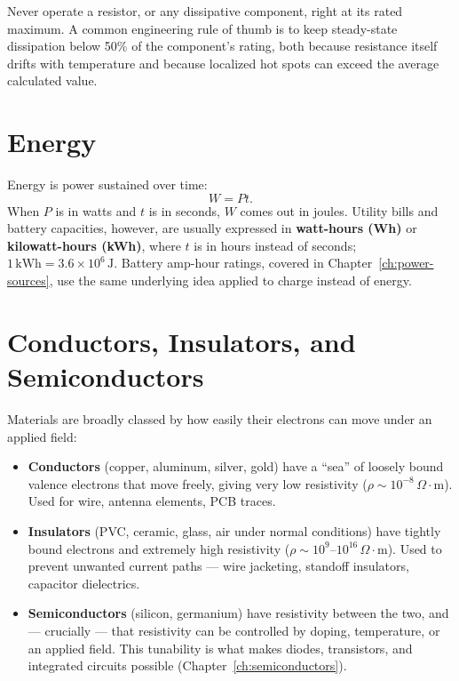 \begin{safetynote}
Never operate a resistor, or any dissipative component, right at its
rated maximum. A common engineering rule of thumb is to keep steady-state
dissipation below 50\% of the component's rating, both because
resistance itself drifts with temperature and because localized hot spots
can exceed the average calculated value.
\label{sec:power-derating}
\end{safetynote}

\section{Energy}

Energy is power sustained over time:
\[
W = Pt.
\]
When $P$ is in watts and $t$ is in seconds, $W$ comes out in joules.
Utility bills and battery capacities, however, are usually expressed in
\textbf{watt-hours (Wh)} or \textbf{kilowatt-hours (kWh)}, where $t$ is in
hours instead of seconds; $1\,\text{kWh} = 3.6\times10^{6}\,\text{J}$.
Battery amp-hour ratings, covered in Chapter~\ref{ch:power-sources}, use
the same underlying idea applied to charge instead of energy.

\section{Conductors, Insulators, and Semiconductors}

Materials are broadly classed by how easily their electrons can move
under an applied field:

\begin{itemize}
\item \textbf{Conductors} (copper, aluminum, silver, gold) have a ``sea''
of loosely bound valence electrons that move freely, giving very low
resistivity ($\rho \sim 10^{-8}\,\Omega\cdot\text{m}$). Used for wire,
antenna elements, PCB traces.
\item \textbf{Insulators} (PVC, ceramic, glass, air under normal
conditions) have tightly bound electrons and extremely high resistivity
($\rho \sim 10^{9}$--$10^{16}\,\Omega\cdot\text{m}$). Used to prevent
unwanted current paths --- wire jacketing, standoff insulators, capacitor
dielectrics.
\item \textbf{Semiconductors} (silicon, germanium) have resistivity
between the two, and --- crucially --- that resistivity can be controlled
by doping, temperature, or an applied field. This tunability is what
makes diodes, transistors, and integrated circuits possible
(Chapter~\ref{ch:semiconductors}).
\end{itemize}

